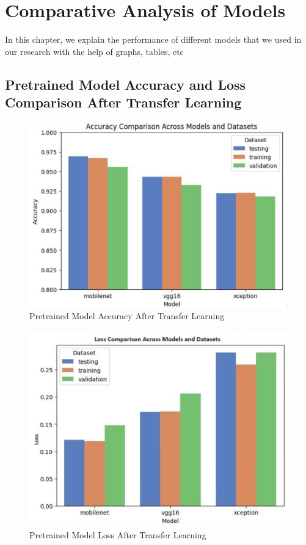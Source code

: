
\section{Comparative Analysis of Models}

In this chapter, we explain the performance of different models that we used in our research with the help of graphs, tables, etc

\subsection{Pretrained Model Accuracy and Loss Comparison After Transfer Learning}
\begin{figure}
    \centering
    \includegraphics[width=0.75\linewidth]{graphics//chapter6/transfer learning acc.png}
    \caption{Pretrained Model Accuracy After Transfer Learning}
    \label{fig:acc-tf}
\end{figure}

\begin{figure}
    \centering
    \includegraphics[width=0.75\linewidth]{graphics//chapter6/model loss transfer learning.png}
    \caption{Pretrained Model Loss After Transfer Learning}
    \label{fig:loss-tf}
\end{figure}

